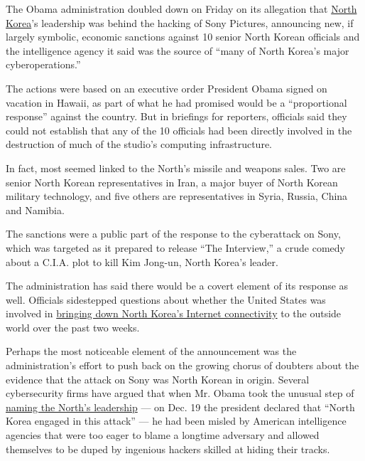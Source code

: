 The Obama administration doubled down on Friday on its allegation that
\href{http://topics.nytimes3xbfgragh.onion/top/news/international/countriesandterritories/northkorea/index.html?inline=nyt-geo}{North
Korea}'s leadership was behind the hacking of Sony Pictures, announcing
new, if largely symbolic, economic sanctions against 10 senior North
Korean officials and the intelligence agency it said was the source of
``many of North Korea's major cyberoperations.''

The actions were based on an executive order President Obama signed on
vacation in Hawaii, as part of what he had promised would be a
``proportional response'' against the country. But in briefings for
reporters, officials said they could not establish that any of the 10
officials had been directly involved in the destruction of much of the
studio's computing infrastructure.

In fact, most seemed linked to the North's missile and weapons sales.
Two are senior North Korean representatives in Iran, a major buyer of
North Korean military technology, and five others are representatives in
Syria, Russia, China and Namibia.

The sanctions were a public part of the response to the cyberattack on
Sony, which was targeted as it prepared to release ``The Interview,'' a
crude comedy about a C.I.A. plot to kill Kim Jong-un, North Korea's
leader.

The administration has said there would be a covert element of its
response as well. Officials sidestepped questions about whether the
United States was involved in
\href{https://www.nytimes3xbfgragh.onion/2014/12/28/world/asia/north-korea-sony-hacking-the-interview.html}{bringing
down North Korea's Internet connectivity} to the outside world over the
past two weeks.

Perhaps the most noticeable element of the announcement was the
administration's effort to push back on the growing chorus of doubters
about the evidence that the attack on Sony was North Korean in origin.
Several cybersecurity firms have argued that when Mr. Obama took the
unusual step of
\href{https://www.nytimes3xbfgragh.onion/2014/12/20/world/fbi-accuses-north-korean-government-in-cyberattack-on-sony-pictures.html}{naming
the North's leadership} --- on Dec. 19 the president declared that
``North Korea engaged in this attack'' --- he had been misled by
American intelligence agencies that were too eager to blame a longtime
adversary and allowed themselves to be duped by ingenious hackers
skilled at hiding their tracks.


